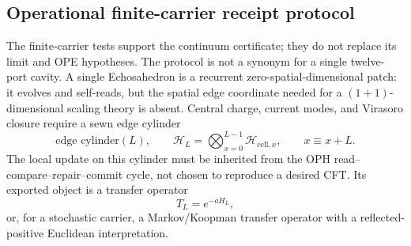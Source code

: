 \documentclass[11pt]{article}
\theoremstyle{remark}
\theoremstyle{plain}
\begin{document}
\subsection{Operational finite-carrier receipt protocol}

The finite-carrier tests support the continuum certificate; they do not
replace its limit and OPE hypotheses. The protocol is not a synonym for a single
twelve-port cavity. A single Echosahedron is a recurrent zero-spatial-dimensional patch: it evolves
and self-reads, but the spatial edge coordinate needed for a
\((1+1)\)-dimensional scaling theory is absent. Central charge, current modes, and Virasoro closure
require a sewn edge cylinder
\[
\text{edge cylinder}(L),
\qquad
\mathcal H_L=\bigotimes_{x=0}^{L-1}\mathcal H_{\mathrm{cell},x},
\qquad x\equiv x+L.
\]
The local update on this cylinder must be inherited from the OPH read--compare--repair--commit
cycle, not chosen to reproduce a desired CFT. Its exported object is a transfer operator
\[
T_L=e^{-aH_L},
\]
or, for a stochastic carrier, a Markov/Koopman transfer operator with a reflected-positive
Euclidean interpretation.
\end{document}
